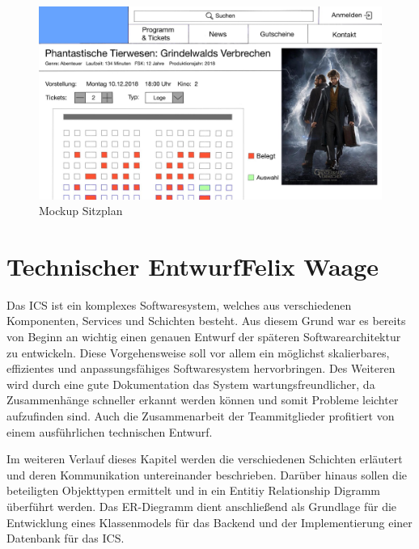 		\begin{figure}[H]
			\centering 
			\includegraphics[width=12cm]{img/mockUp3.png}
			\captionsetup{format=hang}
			\caption[Mockup Sitzplan]{\label{fig:mockUpSitzplan} Mockup Sitzplan }
		\end{figure}
		
		
	
	\section[Technischer Entwurf]{Technischer Entwurf{\hfill \normalsize Felix Waage}} 	

		Das \ac{ICS} ist ein komplexes Softwaresystem, welches aus verschiedenen Komponenten, Services und Schichten besteht. Aus diesem Grund war es bereits von Beginn an wichtig einen genauen Entwurf der späteren Softwarearchitektur zu entwickeln. Diese Vorgehensweise soll vor allem ein möglichst skalierbares, effizientes und anpassungsfähiges Softwaresystem hervorbringen. Des Weiteren wird durch eine gute Dokumentation das System wartungsfreundlicher, da Zusammenhänge schneller erkannt werden können und somit Probleme leichter aufzufinden sind. Auch die Zusammenarbeit der Teammitglieder profitiert von einem ausführlichen technischen Entwurf.
		
			Im weiteren Verlauf dieses Kapitel werden die verschiedenen Schichten erläutert und deren Kommunikation untereinander beschrieben. Darüber hinaus sollen die beteiligten Objekttypen ermittelt und in ein Entitiy Relationship Digramm überführt werden. Das ER-Diegramm dient anschließend als Grundlage für die Entwicklung eines Klassenmodels für das Backend und der Implementierung einer Datenbank für das ICS. 
			

